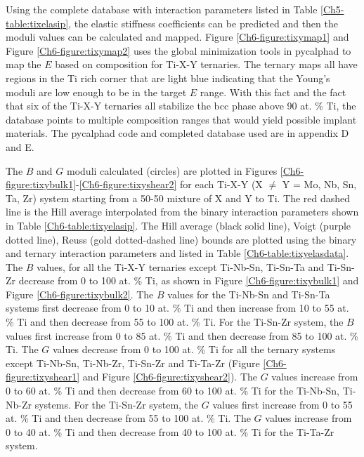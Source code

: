 Using the complete database with interaction parameters listed in Table \ref{Ch5-table:tixelasip}, the elastic stiffness coefficients can be predicted and then the moduli values can be calculated and mapped. Figure \ref{Ch6-figure:tixymap1} and Figure \ref{Ch6-figure:tixymap2} uses the global minimization tools in pycalphad \cite{Otis2017}to map the $E$ based on composition for Ti-X-Y ternaries. The ternary maps all have regions in the Ti rich corner that are light blue indicating that the Young's moduli are low enough to be in the target $E$ range. With this fact and the fact that six of the Ti-X-Y ternaries all stabilize the bcc phase above 90 at. \% Ti, the database points to multiple composition ranges that would yield possible implant materials. The pycalphad code and completed database used are in appendix D and E.

The $B$ and $G$ moduli calculated (circles) are plotted in Figures \ref{Ch6-figure:tixybulk1}-\ref{Ch6-figure:tixyshear2} for each Ti-X-Y (X $\neq$ Y = Mo, Nb, Sn, Ta, Zr) system starting from a 50-50 mixture of X and Y to Ti. The red dashed line is the Hill average interpolated from the binary interaction parameters shown in Table \ref{Ch6-table:tixyelasip}. The Hill average (black solid line), Voigt (purple dotted line), Reuss (gold dotted-dashed line) bounds are plotted using the binary and ternary interaction parameters and listed in Table \ref{Ch6-table:tixyelasdata}. The $B$ values, for all the Ti-X-Y ternaries except Ti-Nb-Sn, Ti-Sn-Ta and Ti-Sn-Zr decrease from 0 to 100 at. \% Ti, as shown in Figure \ref{Ch6-figure:tixybulk1} and Figure \ref{Ch6-figure:tixybulk2}. The $B$ values for the Ti-Nb-Sn and Ti-Sn-Ta systems first decrease from 0 to 10 at. \% Ti and then increase from 10 to 55 at. \% Ti and then decrease from 55 to 100 at. \% Ti. For the Ti-Sn-Zr system, the $B$ values first increase from 0 to 85 at. \% Ti and then decrease from 85 to 100 at. \% Ti. The $G$ values decrease from 0 to 100 at. \% Ti for all the ternary systems except Ti-Nb-Sn, Ti-Nb-Zr, Ti-Sn-Zr and Ti-Ta-Zr (Figure \ref{Ch6-figure:tixyshear1} and Figure \ref{Ch6-figure:tixyshear2}). The $G$ values increase from 0 to 60 at. \% Ti and then decrease from 60 to 100 at. \% Ti for the Ti-Nb-Sn, Ti-Nb-Zr systems. For the Ti-Sn-Zr system, the $G$ values first increase from 0 to 55 at. \% Ti and then decrease from 55 to 100 at. \% Ti. The $G$ values increase from 0 to 40 at. \% Ti and then decrease from 40 to 100 at. \% Ti for the Ti-Ta-Zr system. 


